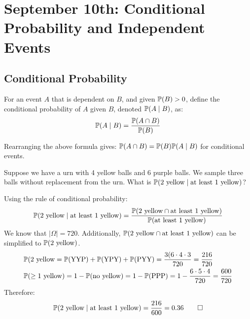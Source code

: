 \section{September 10th: Conditional Probability and Independent Events}

\subsection{Conditional Probability}

For an event $A$ that is dependent on $B$, and given $\mathbb{P}(B) > 0$, define the conditional probability of $A$ given $B$, denoted $\mathbb{P}(A \mid B)$, as:
\[ \mathbb{P}(A \mid B) = \displaystyle\frac{\mathbb{P}(A \cap B)}{\mathbb{P}(B)} \]

\begin{remark}
   Rearranging the above formula gives: $\mathbb{P}(A \cap B) = \mathbb{P}(B) \mathbb{P}(A \mid B)$ for conditional events.
\end{remark}

\begin{example}
   Suppose we have a urn with 4 yellow balls and 6 purple balls. We sample three balls without replacement from the urn. What is $\mathbb{P}(\text{2 yellow} \mid \text{at least 1 yellow})$?
\end{example}
\begin{solution}
   Using the rule of conditional probability:
   \[ \mathbb{P}(\text{2 yellow} \mid \text{at least 1 yellow}) = \displaystyle\frac{\mathbb{P}(\text{2 yellow} \cap \text{at least 1 yellow})}{\mathbb{P}(\text{at least 1 yellow})} \]
   We know that $|\Omega| = 720$. Additionally, $\mathbb{P}(\text{2 yellow} \cap \text{at least 1 yellow})$ can be simplified to $\mathbb{P}(\text{2 yellow})$. 
   \begin{align*}
      &\mathbb{P}(\text{2 yellow} = \mathbb{P}(\text{YYP}) + \mathbb{P}(\text{YPY}) + \mathbb{P}(\text{PYY})= \displaystyle\frac{3(6\cdot4\cdot3}{720} = \displaystyle\frac{216}{720} \\
      &\mathbb{P}(\geq \text{1 yellow}) = 1 - \mathbb{P}(\text{no yellow}) = 1 - \mathbb{P}(\text{PPP}) = 1 - \frac{6 \cdot 5 \cdot 4}{720} = \displaystyle\frac{600}{720}  
   \end{align*}
   Therefore:
   \[ \mathbb{P}(\text{2 yellow} \mid \text{at least 1 yellow}) = \displaystyle\frac{216}{600} = 0.36 \qedhere \]   
\end{solution}

